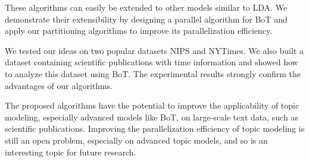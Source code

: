 \documentclass[10pt,conference]{IEEEtran}
\begin{document}
These algorithms can easily be extended to other models similar to LDA. We demonstrate their extensibility by designing a parallel algorithm for BoT and apply our partitioning algorithms to improve its parallelization efficiency.

We tested our ideas on two popular datasets NIPS and NYTimes. We also built a dataset containing scientific publications with time information and showed how to analyze this dataset using BoT. The experimental results strongly confirm the advantages of our algorithms.

The proposed algorithms have the potential to improve the applicability of topic modeling, especially advanced models like BoT, on large-scale text data, such as scientific publications. Improving the parallelization efficiency of topic modeling is still an open problem, especially on advanced topic models, and so is an interesting topic for future research.
\end{document}
